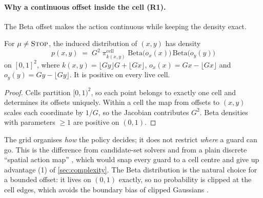 \documentclass[11pt,a4paper]{article}
\begin{document}
\paragraph{Why a continuous offset inside the cell (R1).}
The Beta offset makes the action continuous while keeping the density exact.

\begin{proposition}\label{prop:continuous}
For $\mu\neq\textsc{Stop}$, the induced distribution of $(x,y)$ has density
\[
  p(x,y) \;=\; G^2\;\pi^{\mathrm{cell}}_{k(x,y)}\;
  \mathrm{Beta}\bigl(o_x(x)\bigr)\,\mathrm{Beta}\bigl(o_y(y)\bigr)
\]
on $[0,1]^2$, where $k(x,y) = \lfloor Gy\rfloor G + \lfloor Gx\rfloor$,
$o_x(x) = Gx - \lfloor Gx\rfloor$ and $o_y(y) = Gy - \lfloor Gy\rfloor$. It is positive on every
live cell.
\end{proposition}

\begin{proof}
Cells partition $[0,1)^2$, so each point belongs to exactly one cell and determines its
offsets uniquely. Within a cell the map from offsets to $(x,y)$ scales each coordinate by
$1/G$, so the Jacobian contributes $G^2$. Beta densities with parameters $\ge1$ are positive on
$(0,1)$.
\end{proof}

The grid organises \emph{how} the policy decides; it does not restrict \emph{where} a guard
can go. This is the difference from candidate-set solvers \cite{couto2011,tozoni2016} and
from a plain discrete ``spatial action map'' \cite{wu2020spatial}, which would snap every
guard to a cell centre and give up advantage (1) of \cref{sec:complexity}. The Beta
distribution is the natural choice for a bounded offset: it lives on $(0,1)$ exactly, so no
probability is clipped at the cell edges, which avoids the boundary bias of clipped Gaussians
\cite{chou2017beta}.
\end{document}
